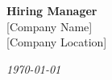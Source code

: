\begin{flushright}
	
\end{flushright}

\vspace{18pt}
\noindent
\begin{minipage}[t]{0.62\textwidth}
\textbf{Hiring Manager}\\
{[Company Name]}\\
{[Company Location]}
\end{minipage}\hfill
\begin{minipage}[t]{0.35\textwidth}
\raggedleft\small\textit{\today}
\end{minipage}

\vspace{12pt}